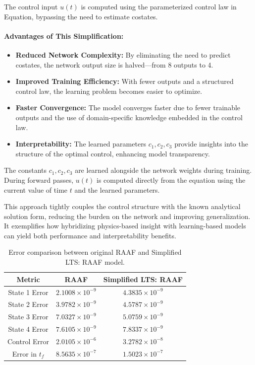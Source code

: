 The control input \( u(t) \) is computed using the parameterized control law in Equation, bypassing the need to estimate costates.

\paragraph{Advantages of This Simplification:}
\begin{itemize}
    \item \textbf{Reduced Network Complexity:} By eliminating the need to predict costates, the network output size is halved—from 8 outputs to 4.
    \item \textbf{Improved Training Efficiency:} With fewer outputs and a structured control law, the learning problem becomes easier to optimize.
    \item \textbf{Faster Convergence:} The model converges faster due to fewer trainable outputs and the use of domain-specific knowledge embedded in the control law.
    \item \textbf{Interpretability:} The learned parameters \( c_1, c_2, c_3 \) provide insights into the structure of the optimal control, enhancing model transparency.
\end{itemize}

The constants \( c_1, c_2, c_3 \) are learned alongside the network weights during training. During forward passes, \( u(t) \) is computed directly from the equation using the current value of time \( t \) and the learned parameters.

This approach tightly couples the control structure with the known analytical solution form, reducing the burden on the network and improving generalization. It exemplifies how hybridizing physics-based insight with learning-based models can yield both performance and interpretability benefits.

\vspace{-0.5em}
\begin{table}[H]
\centering
\begin{tabular}{|c|c|c|}
\hline
\textbf{Metric} & \textbf{RAAF} & \textbf{Simplified LTS: RAAF} \\
\hline
State 1 Error & \( 2.1008 \times 10^{-9} \) & \( 4.3835 \times 10^{-9} \) \\
State 2 Error & \( 3.9782 \times 10^{-9} \) & \( 4.5787 \times 10^{-9} \) \\
State 3 Error & \( 7.0327 \times 10^{-9} \) & \( 5.0759 \times 10^{-9} \) \\
State 4 Error & \( 7.6105 \times 10^{-9} \) & \( 7.8337 \times 10^{-9} \) \\
Control Error & \( 2.0105 \times 10^{-6} \) & \( 3.2782 \times 10^{-8} \) \\
Error in \( t_f \) & \( 8.5635 \times 10^{-7} \) & \( 1.5023 \times 10^{-7} \) \\
\hline
\end{tabular}
\caption{Error comparison between original RAAF and Simplified LTS: RAAF model.}
\end{table}

